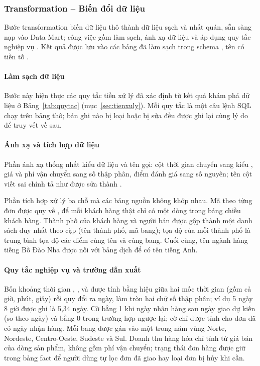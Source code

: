 \subsubsection{Transformation -- Biến đổi dữ liệu}

Bước transformation biến dữ liệu thô thành dữ liệu sạch và nhất quán, sẵn sàng nạp vào Data Mart; công việc gồm làm sạch, ánh xạ dữ liệu và áp dụng quy tắc nghiệp vụ \cite{han}. Kết quả được lưu vào các bảng đã làm sạch trong schema , tên có tiền tố .

\paragraph{Làm sạch dữ liệu}

Bước này hiện thực các quy tắc tiền xử lý đã xác định từ kết quả khám phá dữ liệu ở Bảng~\ref{tab:quytac} (mục~\ref{sec:tienxuly}). Mỗi quy tắc là một câu lệnh SQL chạy trên bảng thô; bản ghi nào bị loại hoặc bị sửa đều được ghi lại cùng lý do để truy vết về sau.

\paragraph{Ánh xạ và tích hợp dữ liệu}

Phần ánh xạ thống nhất kiểu dữ liệu và tên gọi: cột thời gian chuyển sang kiểu , giá và phí vận chuyển sang số thập phân, điểm đánh giá sang số nguyên; tên cột viết sai chính tả như  được sửa thành .

Phần tích hợp xử lý ba chỗ mà các bảng nguồn không khớp nhau. Mã  theo từng đơn được quy về , để mỗi khách hàng thật chỉ có một dòng trong bảng chiều khách hàng. Thành phố của khách hàng và người bán được gộp thành một danh sách duy nhất theo cặp (tên thành phố, mã bang); tọa độ của mỗi thành phố là trung bình tọa độ các điểm  cùng tên và cùng bang. Cuối cùng, tên ngành hàng tiếng Bồ Đào Nha được nối với bảng dịch để có tên tiếng Anh.

\paragraph{Quy tắc nghiệp vụ và trường dẫn xuất}

Bốn khoảng thời gian , ,  và  được tính bằng hiệu giữa hai mốc thời gian (gồm cả giờ, phút, giây) rồi quy đổi ra ngày, làm tròn hai chữ số thập phân; ví dụ 5 ngày 8 giờ được ghi là 5,34 ngày. Cờ  bằng 1 khi ngày nhận hàng sau ngày giao dự kiến (so theo ngày) và bằng 0 trong trường hợp ngược lại; cờ chỉ được tính cho đơn đã có ngày nhận hàng. Mỗi bang được gán vào một trong năm vùng Norte, Nordeste, Centro-Oeste, Sudeste và Sul. Doanh thu hàng hóa chỉ tính từ giá bán của dòng sản phẩm, không gồm phí vận chuyển; trạng thái đơn hàng được giữ trong bảng fact để người dùng tự lọc đơn đã giao hay loại đơn bị hủy khi cần.

